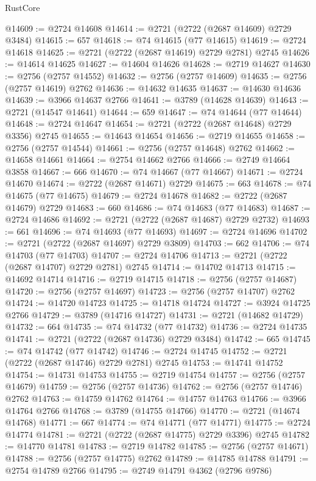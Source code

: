\begin{lexlean}{RustCore}
\begin{coremodule}
@14609 := @2724 @14608
@14614 := @2721 (@2722 (@2687 @14609) @2729 @3484)
@14615 := 657
@14618 := @74 @14615 (@77 @14615)
@14619 := @2724 @14618
@14625 := @2721 (@2722 (@2687 @14619) @2729 @2781) @2745
@14626 := @14614 @14625
@14627 := @14604 @14626
@14628 := @2719 @14627
@14630 := @2756 (@2757 @14552)
@14632 := @2756 (@2757 @14609)
@14635 := @2756 (@2757 @14619) @2762
@14636 := @14632 @14635
@14637 := @14630 @14636
@14639 := @3966 @14637 @2766
@14641 := @3789 (@14628 @14639)
@14643 := @2721 (@14547 @14641)
@14644 := 659
@14647 := @74 @14644 (@77 @14644)
@14648 := @2724 @14647
@14654 := @2721 (@2722 (@2687 @14648) @2729 @3356) @2745
@14655 := @14643 @14654
@14656 := @2719 @14655
@14658 := @2756 (@2757 @14544)
@14661 := @2756 (@2757 @14648) @2762
@14662 := @14658 @14661
@14664 := @2754 @14662 @2766
@14666 := @2749 @14664 @3858
@14667 := 666
@14670 := @74 @14667 (@77 @14667)
@14671 := @2724 @14670
@14674 := @2722 (@2687 @14671) @2729
@14675 := 663
@14678 := @74 @14675 (@77 @14675)
@14679 := @2724 @14678
@14682 := @2722 (@2687 @14679) @2729
@14683 := 660
@14686 := @74 @14683 (@77 @14683)
@14687 := @2724 @14686
@14692 := @2721 (@2722 (@2687 @14687) @2729 @2732)
@14693 := 661
@14696 := @74 @14693 (@77 @14693)
@14697 := @2724 @14696
@14702 := @2721 (@2722 (@2687 @14697) @2729 @3809)
@14703 := 662
@14706 := @74 @14703 (@77 @14703)
@14707 := @2724 @14706
@14713 := @2721 (@2722 (@2687 @14707) @2729 @2781) @2745
@14714 := @14702 @14713
@14715 := @14692 @14714
@14716 := @2719 @14715
@14718 := @2756 (@2757 @14687)
@14720 := @2756 (@2757 @14697)
@14723 := @2756 (@2757 @14707) @2762
@14724 := @14720 @14723
@14725 := @14718 @14724
@14727 := @3924 @14725 @2766
@14729 := @3789 (@14716 @14727)
@14731 := @2721 (@14682 @14729)
@14732 := 664
@14735 := @74 @14732 (@77 @14732)
@14736 := @2724 @14735
@14741 := @2721 (@2722 (@2687 @14736) @2729 @3484)
@14742 := 665
@14745 := @74 @14742 (@77 @14742)
@14746 := @2724 @14745
@14752 := @2721 (@2722 (@2687 @14746) @2729 @2781) @2745
@14753 := @14741 @14752
@14754 := @14731 @14753
@14755 := @2719 @14754
@14757 := @2756 (@2757 @14679)
@14759 := @2756 (@2757 @14736)
@14762 := @2756 (@2757 @14746) @2762
@14763 := @14759 @14762
@14764 := @14757 @14763
@14766 := @3966 @14764 @2766
@14768 := @3789 (@14755 @14766)
@14770 := @2721 (@14674 @14768)
@14771 := 667
@14774 := @74 @14771 (@77 @14771)
@14775 := @2724 @14774
@14781 := @2721 (@2722 (@2687 @14775) @2729 @3396) @2745
@14782 := @14770 @14781
@14783 := @2719 @14782
@14785 := @2756 (@2757 @14671)
@14788 := @2756 (@2757 @14775) @2762
@14789 := @14785 @14788
@14791 := @2754 @14789 @2766
@14795 := @2749 @14791 @4362 (@2796 @9786)

\end{coremodule}
\end{lexlean}
